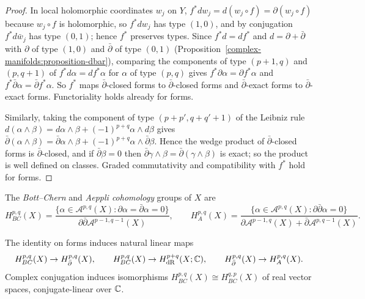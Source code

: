 \begin{proof}
In local holomorphic coordinates $w_j$ on $Y$, $f^*dw_j = d(w_j \circ f) = \partial(w_j \circ f)$ because $w_j \circ f$ is holomorphic, so $f^*dw_j$ has type $(1,0)$, and by conjugation $f^*d\bar w_j$ has type $(0,1)$;
hence $f^*$ preserves types. Since $f^*d = df^*$ and $d = \partial + \bar\partial$ with $\partial$ of type $(1,0)$ and $\bar\partial$ of type $(0,1)$ (Proposition~\ref{complex-manifolds:proposition-dbar}), comparing the
components of type $(p+1,q)$ and $(p,q+1)$ of $f^*d\alpha = df^*\alpha$ for $\alpha$ of type $(p,q)$ gives $f^*\partial\alpha = \partial f^*\alpha$ and $f^*\bar\partial\alpha = \bar\partial f^*\alpha$. So $f^*$ maps
$\bar\partial$-closed forms to $\bar\partial$-closed forms and $\bar\partial$-exact forms to $\bar\partial$-exact forms. Functoriality holds already for forms.

Similarly, taking the component of type $(p+p',q+q'+1)$ of the Leibniz rule $d(\alpha \wedge \beta) = d\alpha \wedge \beta + (-1)^{p+q}\alpha \wedge d\beta$ gives
$\bar\partial(\alpha \wedge \beta) = \bar\partial\alpha \wedge \beta + (-1)^{p+q}\alpha \wedge \bar\partial\beta$. Hence the wedge product of $\bar\partial$-closed forms is $\bar\partial$-closed, and if $\bar\partial\beta = 0$
then $\bar\partial\gamma \wedge \beta = \bar\partial(\gamma \wedge \beta)$ is exact; so the product is well defined on classes. Graded commutativity and compatibility with $f^*$ hold for forms.
\end{proof}

\begin{definition}\label{dolbeault:definition-bott-chern}
The \emph{Bott--Chern} and \emph{Aeppli cohomology} groups of $X$ are
\[
H^{p,q}_{BC}(X) = \frac{\{\alpha \in \mathcal{A}^{p,q}(X) : \partial\alpha = \bar\partial\alpha = 0\}}{\partial\bar\partial\mathcal{A}^{p-1,q-1}(X)}, \qquad
H^{p,q}_{A}(X) = \frac{\{\alpha \in \mathcal{A}^{p,q}(X) : \partial\bar\partial\alpha = 0\}}{\partial\mathcal{A}^{p-1,q}(X) + \bar\partial\mathcal{A}^{p,q-1}(X)}.
\]
\end{definition}

\begin{lemma}\label{dolbeault:lemma-bott-chern-maps}
The identity on forms induces natural linear maps
\[
H^{p,q}_{BC}(X) \to H^{p,q}_{\bar\partial}(X), \qquad H^{p,q}_{BC}(X) \to H^{p+q}_{\mathrm{dR}}(X; \mathbb{C}), \qquad H^{p,q}_{\bar\partial}(X) \to H^{p,q}_{A}(X).
\]
Complex conjugation induces isomorphisms $H^{p,q}_{BC}(X) \cong H^{q,p}_{BC}(X)$ of real vector spaces, conjugate-linear over $\mathbb{C}$.
\end{lemma}

